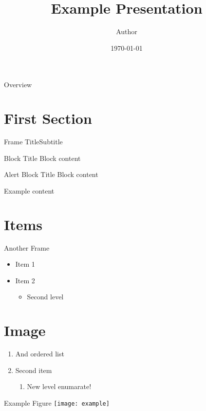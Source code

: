 \documentclass[aspectratio=1610]{beamer}
\title{Example Presentation}
\author{Author}
\date{\today}
\institute{KTH Mechanics}
\begin{document}
\startpage
\begin{frame}[noframenumbering]

  \maketitle

\end{frame}


\normalpage

\begin{frame}{Overview}
\tableofcontents
    
\end{frame}
\section{First Section}
\begin{frame}{Frame Title}{Subtitle}
\begin{block}{Block Title}
    Block content
\end{block}
\begin{alertblock}{Alert Block Title}
    Block content
\end{alertblock}

\begin{example}
    Example content
\end{example}
\end{frame}

\section{Items}
\begin{frame}{Another Frame}
\begin{itemize}
    \item Item 1
    \item Item 2
    \begin{itemize}
        \item Second level
    \end{itemize}
\end{itemize}

\section{Image}
\begin{enumerate}
    \item And ordered list
    \item Second item
    \begin{enumerate}
        \item New level enumarate!
    \end{enumerate}
\end{enumerate}
\end{frame}

\begin{frame}{Example Figure}
\texttt{[image: example]}
\end{frame}
\end{document}
